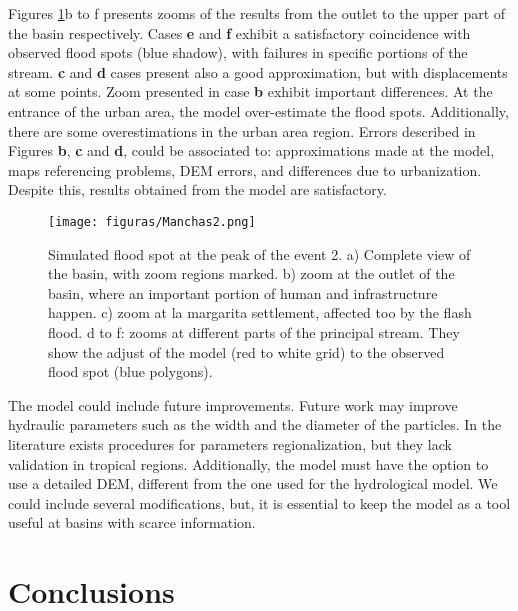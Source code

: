 {Figures \ref{fig:SimFloodSpots}b to f presents zooms of the results from the outlet to the upper part of the basin respectively. Cases \textbf{e} and \textbf{f} exhibit a satisfactory coincidence with observed flood spots (blue shadow), with failures in specific portions of the stream.  \textbf{c} and \textbf{d} cases present also a good approximation, but with displacements at some points.  Zoom presented in case \textbf{b}  exhibit important differences.  At the entrance of the urban area, the model over-estimate the flood spots.  Additionally, there are some overestimations in the urban area region.  Errors described in Figures \textbf{b}, \textbf{c} and \textbf{d}, could be associated to:  approximations made at the model, maps referencing problems, DEM errors, and differences due to urbanization.  Despite this, results obtained from the model are satisfactory.\\

\begin{figure}[t!]
\centering
 \texttt{[image: figuras/Manchas2.png]}
 \caption{Simulated flood spot at the peak of the event 2. a) Complete view of the basin, with zoom regions marked. b) zoom at the outlet of the basin, where an important portion of human and infrastructure happen. c) zoom at la margarita settlement, affected too by the flash flood. d to f: zooms at different parts of the principal stream. They show the adjust of the model (red to white grid) to the observed flood spot (blue polygons).}
    \label{fig:SimFloodSpots}
\end{figure}

The model could include future improvements.  Future work may improve hydraulic parameters such as the width and the diameter of the particles. In the literature exists procedures for parameters regionalization, but they lack validation in tropical regions.  Additionally, the model must have the option to use a detailed DEM, different from the one used for the hydrological model.  We could include several modifications, but, it is essential to keep the model as a tool useful at basins with scarce information.\\

\vspace{5cm}
\section{Conclusions}  %

}

